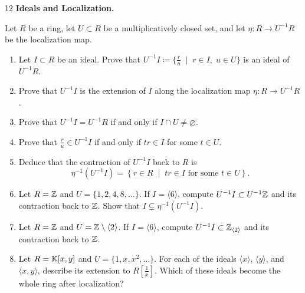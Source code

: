 \documentclass[Notebook.tex]{subfiles}
\begin{document}
\begin{problem}{12}
	\textbf{Ideals and Localization.} 
	
	Let $R$ be a ring, let $U\subset R$ be a multiplicatively closed set, and let $\eta:R\to U^{-1}R$ be the localization map.
	\begin{enumerate}
		\item Let $I\subset R$ be an ideal. Prove that $U^{-1}I\coloneqq \{\frac{r}{u}\;\; |\;\; r\in I,\; u\in U\}$ is an ideal of $U^{-1}R$.
		\item Prove that $U^{-1}I$ is the extension of $I$ along the localization map $\eta:R\to U^{-1}R$.
		\item Prove that $U^{-1}I=U^{-1}R$ if and only if $I\cap U\neq \varnothing$.
		\item Prove that $\frac{r}{u}\in U^{-1}I$ if and only if $tr \in I$ for some $t \in U$. 
		\item Deduce that the contraction of $U^{-1}I$ back to $R$ is
		\[
		\eta^{-1}(U^{-1}I)=\left\{r\in R\;\; \big|\;\; tr\in I \text{ for some } t\in U\right\}.
		\]
		\item Let $R=\mathbb Z$ and $U=\{1,2,4,8,\ldots\}$. If $I=\langle 6\rangle$, compute $U^{-1}I\subset U^{-1}\mathbb Z$ and its contraction back to $\mathbb Z$. Show that $I\subsetneq \eta^{-1}(U^{-1}I)$.
		\item Let $R=\mathbb Z$ and $U=\mathbb Z\setminus \langle 2\rangle$. If $I=\langle 6\rangle$, compute  $U^{-1}I\subset \mathbb Z_{\langle 2\rangle}$ and its contraction back to $\mathbb Z$.
		\item Let $R=\mathbb K[x,y]$ and $U=\{1,x,x^2,\ldots\}$. For each of the ideals $\langle x\rangle$, $\langle y\rangle$, and $\langle x,y\rangle$, describe its extension to $R[\frac{1}{x}]$. Which of these ideals become the whole ring after localization?
	\end{enumerate}
\end{problem}
\end{document}
